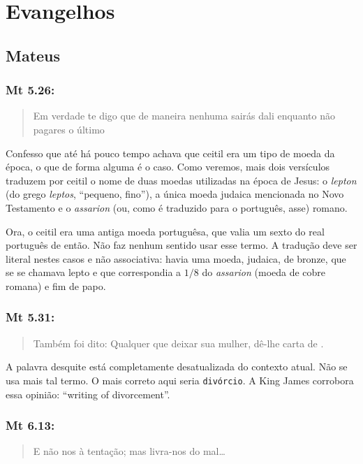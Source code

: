 \chapter{Evangelhos}
\section{Mateus}
\subsection{Mt 5.26:}\label{ceitil}
\begin{quote}
 \small
 Em verdade te digo que de maneira nenhuma sairás dali enquanto não pagares o último 
\end{quote}

Confesso que até há pouco tempo achava que ceitil era um tipo de moeda
da época, o que de forma alguma é o caso. Como veremos, mais dois
versículos traduzem por ceitil o nome de duas moedas utilizadas na
época de Jesus: o \emph{lepton} (do grego \emph{leptos}, ``pequeno,
fino''), a única moeda judaica mencionada no Novo Testamento e o
\emph{assarion} (ou, como é traduzido para o português, asse) romano.

Ora, o ceitil era uma antiga moeda portuguêsa, que valia um sexto do
real português de então. Não faz nenhum sentido usar esse termo. A
tradução deve ser literal nestes casos e não associativa: havia
uma moeda, judaica, de bronze, que se se chamava lepto e que
correspondia a $1/8$ do \emph{assarion} (moeda de cobre romana) e fim
de papo.

\subsection{Mt 5.31:}
\begin{quote}
 \small
 Também foi dito: Qualquer que deixar sua mulher, dê-lhe carta de .
\end{quote}

A palavra desquite está completamente desatualizada do contexto atual. Não se usa mais tal termo. O mais correto aqui seria \texttt{divórcio}. A King James corrobora essa opinião: ``writing of divorcement''.

\subsection{Mt 6.13:}
\begin{quote}
 \small
 E não nos  à tentação; mas livra-nos do mal\ldots
\end{quote}

